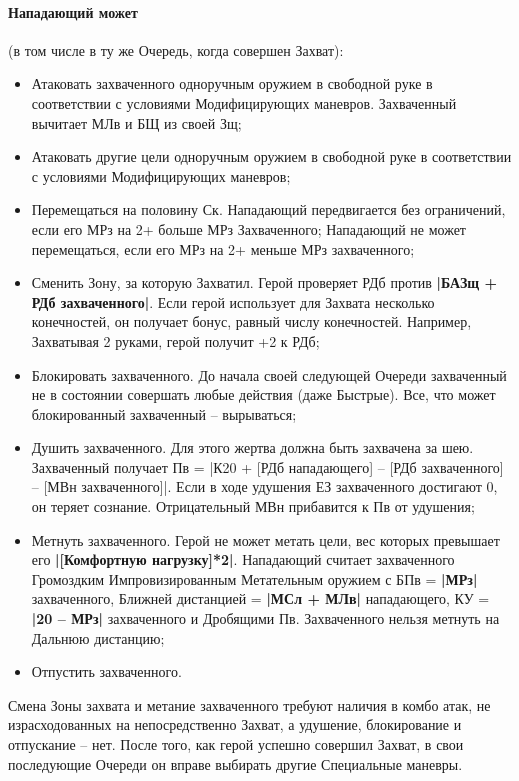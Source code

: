 \paragraph{Нападающий может} (в том числе в ту же Очередь, когда совершен Захват):
\begin{itemize}
  \item Атаковать захваченного одноручным оружием в свободной руке в соответствии с условиями Модифицирующих маневров. Захваченный вычитает МЛв и БЩ из своей Зщ;
  \item Атаковать другие цели одноручным оружием в свободной руке в соответствии с условиями Модифицирующих маневров;
  \item Перемещаться на половину Ск. Нападающий передвигается без ограничений, если его МРз на 2+ больше МРз Захваченного; Нападающий не может перемещаться, если его МРз на 2+ меньше МРз захваченного;
  \item Сменить Зону, за которую Захватил. Герой проверяет РДб против \textbf{|БАЗщ + РДб захваченного|}. Если герой использует для Захвата несколько конечностей, он получает бонус, равный числу конечностей. Например, Захватывая 2 руками, герой получит +2 к РДб;
  \item Блокировать захваченного. До начала своей следующей Очереди захваченный не в состоянии совершать любые действия (даже Быстрые). Все, что может блокированный захваченный – вырываться;
  \item Душить захваченного. Для этого жертва должна быть захвачена за шею. Захваченный получает Пв = |К20 + [РДб нападающего] – [РДб захваченного] – [МВн захваченного]|. Если в ходе удушения ЕЗ захваченного достигают 0, он теряет сознание. Отрицательный МВн прибавится к Пв от удушения;
  \item Метнуть захваченного. Герой не может метать цели, вес которых превышает его \textbf{|[Комфортную нагрузку]*2|}.
    \newline Нападающий считает захваченного Громоздким Импровизированным Метательным оружием с БПв = \textbf{|МРз|} захваченного, Ближней дистанцией = \textbf{|МСл + МЛв|} нападающего, КУ = \textbf{|20 – МРз|} захваченного и Дробящими Пв. Захваченного нельзя метнуть на Дальнюю дистанцию;
  \item Отпустить захваченного.
\end{itemize}
Смена Зоны захвата и метание захваченного требуют наличия в комбо атак, не израсходованных на непосредственно Захват, а удушение, блокирование и отпускание – нет.
\newline После того, как герой успешно совершил Захват, в свои последующие Очереди он вправе выбирать другие Специальные маневры.

